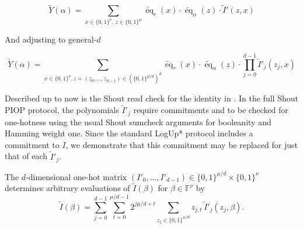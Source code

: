 $$
\widetilde{Y}(\alpha)
= \sum_{x \in \{0,1\}^{\nu},\, z \in \{0,1\}^{\mu}} 
\widetilde{\operatorname{eq}}_r(x) \cdot 
\widetilde{\operatorname{eq}}_\alpha(z) \cdot 
\widetilde{I}'(z, x)
$$

And adjusting to general-$d$

$$
\widetilde{Y}(\alpha) 
= \sum_{
    x \in \{0,1\}^{\nu}, 
    z=(z_0, \ldots, z_{d-1}) \in (\{0,1\}^{\mu/d})^{d}
    } 
\widetilde{\operatorname{eq}}_r(x) \cdot 
\widetilde{\operatorname{eq}}_\alpha(z) \cdot 
\prod_{j=0}^{d-1} \widetilde{I}'_j(z_j, x)
$$

Described up to now is the Shout read check for the identity in . In the full Shout 
PIOP protocol, the polynomials $\widetilde{I}'_j$ require commitments and to be checked for one-hotness 
using the usual Shout sumcheck arguments for booleanity and Hamming weight one. Since the standard LogUp* 
protocol includes a commitment to $I$, we demonstrate that this commitment may be replaced for just that 
of each $\widetilde{I}'_j$.

\begin{lemma}\label{lem:reconstruct}
The $d$-dimensional one-hot matrix $(I'_0,\ldots,I'_{d-1}) \in \{0,1\}^{\mu/d}\times\{0,1\}^{\nu}$ 
determines arbitrary evaluations of $\widetilde{I}(\beta)$ for $\beta\in\mathbb{F}^\nu$ by
\[
\widetilde{I}(\beta)
=
\sum_{j=0}^{d-1}
\sum_{t=0}^{\mu/d-1}
2^{j\mu/d+t}
\sum_{z_j\in\{0,1\}^{\mu/d}}
z_{j,t}\,\widetilde{I}'_j(z_j,\beta).
\]
\end{lemma}

